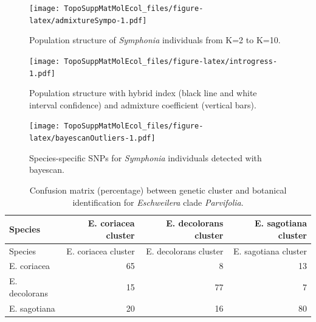 \documentclass[12pt,]{article}
\begin{document}
\newpage

\begin{figure}
\centering
\texttt{[image: TopoSuppMatMolEcol\_files/figure-latex/admixtureSympo-1.pdf]}
\caption{\label{fig:admixtureSympo}Population structure of \emph{Symphonia} individuals from K=2 to K=10.}
\end{figure}

\newpage

\begin{figure}
\centering
\texttt{[image: TopoSuppMatMolEcol\_files/figure-latex/introgress-1.pdf]}
\caption{\label{fig:introgress}Population structure with hybrid index (black line and white interval confidence) and admixture coefficient (vertical bars).}
\end{figure}

\newpage

\begin{figure}
\centering
\texttt{[image: TopoSuppMatMolEcol\_files/figure-latex/bayescanOutliers-1.pdf]}
\caption{\label{fig:bayescanOutliers}Species-specific SNPs for \emph{Symphonia} individuals detected with bayescan.}
\end{figure}

\newpage

\begin{longtable}[]{@{}lrrr@{}}
\caption{\label{tab:kmeansConfusion}Confusion matrix (percentage) between genetic cluster and botanical identification for \emph{Eschweilera} clade \emph{Parvifolia}.}\tabularnewline
\toprule
Species & E. coriacea cluster & E. decolorans cluster & E. sagotiana cluster\tabularnewline
\midrule
\endfirsthead
\toprule
Species & E. coriacea cluster & E. decolorans cluster & E. sagotiana cluster\tabularnewline
\midrule
\endhead
E. coriacea & 65 & 8 & 13\tabularnewline
E. decolorans & 15 & 77 & 7\tabularnewline
E. sagotiana & 20 & 16 & 80\tabularnewline
\bottomrule
\end{longtable}


\end{document}
